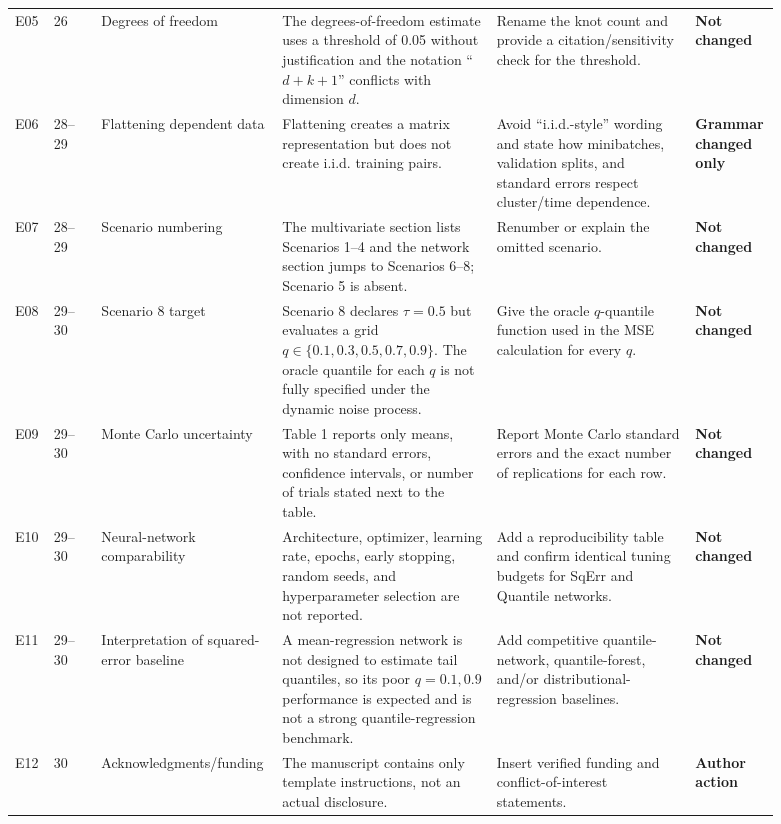 \documentclass[11pt]{article}
\newcommand{\status}[1]{\textcolor{implgreen}{\textbf{#1}}}
\begin{document}
\begin{landscape}
\begin{longtable}{L{0.045\linewidth}L{0.065\linewidth}L{0.16\linewidth}L{0.275\linewidth}L{0.255\linewidth}L{0.09\linewidth}}
E05 & 26 & Degrees of freedom & The degrees-of-freedom estimate uses a threshold of 0.05 without justification and the notation “$d+k+1$” conflicts with dimension $d$. & Rename the knot count and provide a citation/sensitivity check for the threshold. & \status{Not changed}\\
E06 & 28--29 & Flattening dependent data & Flattening creates a matrix representation but does not create i.i.d. training pairs. & Avoid “i.i.d.-style” wording and state how minibatches, validation splits, and standard errors respect cluster/time dependence. & \status{Grammar changed only}\\
E07 & 28--29 & Scenario numbering & The multivariate section lists Scenarios 1--4 and the network section jumps to Scenarios 6--8; Scenario 5 is absent. & Renumber or explain the omitted scenario. & \status{Not changed}\\
E08 & 29--30 & Scenario 8 target & Scenario 8 declares $\tau=0.5$ but evaluates a grid $q\in\{0.1,0.3,0.5,0.7,0.9\}$. The oracle quantile for each $q$ is not fully specified under the dynamic noise process. & Give the oracle $q$-quantile function used in the MSE calculation for every $q$. & \status{Not changed}\\
E09 & 29--30 & Monte Carlo uncertainty & Table 1 reports only means, with no standard errors, confidence intervals, or number of trials stated next to the table. & Report Monte Carlo standard errors and the exact number of replications for each row. & \status{Not changed}\\
E10 & 29--30 & Neural-network comparability & Architecture, optimizer, learning rate, epochs, early stopping, random seeds, and hyperparameter selection are not reported. & Add a reproducibility table and confirm identical tuning budgets for SqErr and Quantile networks. & \status{Not changed}\\
E11 & 29--30 & Interpretation of squared-error baseline & A mean-regression network is not designed to estimate tail quantiles, so its poor $q=0.1,0.9$ performance is expected and is not a strong quantile-regression benchmark. & Add competitive quantile-network, quantile-forest, and/or distributional-regression baselines. & \status{Not changed}\\
E12 & 30 & Acknowledgments/funding & The manuscript contains only template instructions, not an actual disclosure. & Insert verified funding and conflict-of-interest statements. & \status{Author action}\\
\end{longtable}
\end{landscape}
\end{document}
